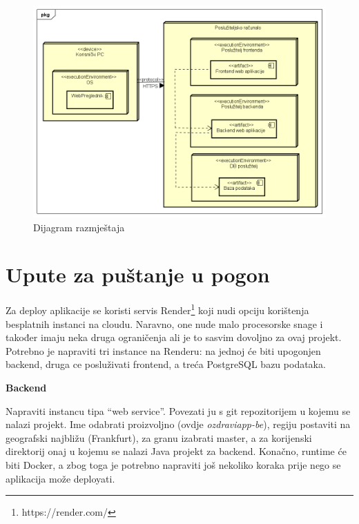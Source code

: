 			 \begin{figure}[H]
			 	\includegraphics[width=\textwidth]{dijagrami/Dijagram razmjestaja.PNG} %
			 	\caption{Dijagram razmještaja}
			 	\label{fig:dijagramrazmjestaja} %
			 \end{figure}
			
			\eject 
		
		\section{Upute za puštanje u pogon}
			 
			 Za deploy aplikacije se koristi servis Render\footnote{https://render.com/} koji nudi opciju korištenja besplatnih instanci na cloudu. Naravno, one nude malo procesorske snage i također imaju neka druga ograničenja ali je to sasvim dovoljno za ovaj projekt. Potrebno je napraviti tri instance na Renderu: na jednoj će biti upogonjen backend, druga ce posluživati frontend, a treća PostgreSQL bazu podataka.
			 
			 
			 \textbf{Backend}
			 
			 Napraviti instancu tipa “web service”. Povezati ju s git repozitorijem u kojemu se nalazi projekt. Ime odabrati proizvoljno (ovdje \textit{ozdraviapp-be}), regiju postaviti na geografski najbližu (Frankfurt), za granu izabrati master, a za korijenski direktorij onaj u kojemu se nalazi Java projekt za backend. Konačno, runtime će biti Docker, a zbog toga je potrebno napraviti još nekoliko koraka prije nego se aplikacija može deployati.
			 
